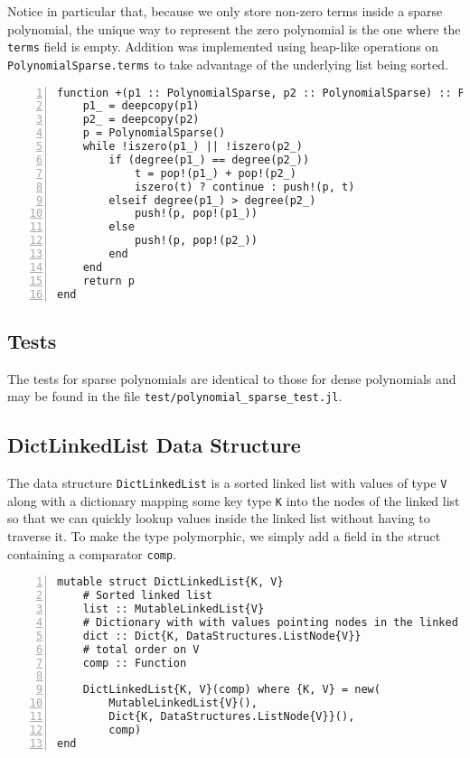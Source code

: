 \documentclass{article}
\theoremstyle{plain}
\numberwithin{theorem}{section}
\numberwithin{example}{section}
\theoremstyle{definition}
\numberwithin{definition}{section}
\begin{document}
Notice in particular that, because we only store non-zero terms inside a sparse
polynomial, the unique way to represent the zero polynomial is the one where the
\texttt{terms} field is empty. Addition was implemented using heap-like
operations on \texttt{PolynomialSparse.terms} to take advantage of the
underlying list being sorted.

\begin{codebox}
    \begin{Verbatim}[numbers=left,xleftmargin=5mm]
function +(p1 :: PolynomialSparse, p2 :: PolynomialSparse) :: PolynomialSparse
    p1_ = deepcopy(p1)
    p2_ = deepcopy(p2)
    p = PolynomialSparse()
    while !iszero(p1_) || !iszero(p2_)
        if (degree(p1_) == degree(p2_))
            t = pop!(p1_) + pop!(p2_)
            iszero(t) ? continue : push!(p, t)
        elseif degree(p1_) > degree(p2_)
            push!(p, pop!(p1_))
        else
            push!(p, pop!(p2_))
        end
    end
    return p
end
    \end{Verbatim}
\end{codebox}

\bigbreak

\subsection{Tests}
The tests for sparse polynomials are identical to those for dense polynomials
and may be found in the file \texttt{test/polynomial\_sparse\_test.jl}.

\bigbreak

\subsection{DictLinkedList Data Structure} \label{dll}
The data structure \texttt{DictLinkedList} is a sorted
linked list with values of type \texttt V along with a dictionary mapping some
key type \texttt K into the nodes of the linked list so that we can quickly
lookup values inside the linked list without having to traverse it. To make
the type polymorphic, we simply add a field in the struct containing a
comparator \texttt{comp}.

\begin{codebox}
    \begin{Verbatim}[numbers=left,xleftmargin=5mm]
mutable struct DictLinkedList{K, V}
    # Sorted linked list
    list :: MutableLinkedList{V}
    # Dictionary with with values pointing nodes in the linked list
    dict :: Dict{K, DataStructures.ListNode{V}}
    # total order on V
    comp :: Function

    DictLinkedList{K, V}(comp) where {K, V} = new(
        MutableLinkedList{V}(),
        Dict{K, DataStructures.ListNode{V}}(),
        comp)
end
    \end{Verbatim}
\end{codebox}
\end{document}
